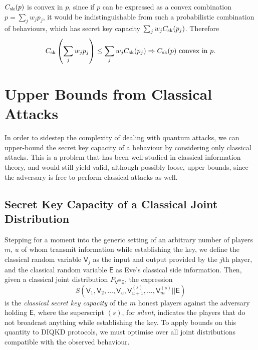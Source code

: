 \documentclass[10pt, a4paper]{article}
\numberwithin{equation}{section} %
\theoremstyle{definition}
\theoremstyle{plain}
\newcommand{\?}{\mathrel{?}} %
\newcommand{\cvec}[1]{\boldsymbol{\mathbf{#1}}}    %
\newcommand{\crv}[1]{\mathsf{#1}}
\newcommand{\sk}{\rm sk}
\begin{document}
      \(C_{\sk}(p)\) is convex in \(p\), since if \(p\) can be expressed as a convex combination \(p = \sum_j w_j p_j\), it would be indistinguishable from such a probabilistic combination of behaviours, which has secret key capacity \(\sum_j w_j C_{\sk}(p_j)\). Therefore
      \begin{equation}
        C_{\sk}\left(\sum_j w_j p_j\right) \leq \sum_j w_j C_{\sk}(p_j) \Rightarrow C_{\sk}(p)\text{ convex in }p.
      \end{equation}

    \section{Upper Bounds from Classical Attacks}

    In order to sidestep the complexity of dealing with quantum attacks, we can upper-bound the secret key capacity of a behaviour by considering only classical attacks. This is a problem that has been well-studied in classical information theory, and would still yield valid, although possibly loose, upper bounds, since the adversary is free to perform classical attacks as well.

    \subsection{Secret Key Capacity of a Classical Joint Distribution}

    Stepping for a moment into the generic setting of an arbitrary number of players \(m\), \(u\) of whom transmit information while establishing the key, we define the classical random variable \(\crv{V}_j\) as the input and output provided by the \(j\)th player, and the classical random variable \(\crv{E}\) as Eve's classical side information. Then, given a classical joint distribution \(P_{\cvec{\crv{V}}^m\crv{E}}\), the expression
    \begin{equation}
      S(\crv{V}_1, \crv{V}_2, \ldots, \crv{V}_{u}, \crv{V}_{u+1}^{(s)}, \ldots, \crv{V}_{m}^{(s)} || \crv{E})
    \end{equation}
    is the \emph{classical secret key capacity} of the \(m\) honest players against the adversary holding \(\crv{E}\), where the superscript \((s)\), for \emph{silent}, indicates the players that do not broadcast anything while establishing the key. To apply bounds on this quantity to DIQKD protocols, we must optimise over all joint distributions compatible with the observed behaviour.

\end{document}

